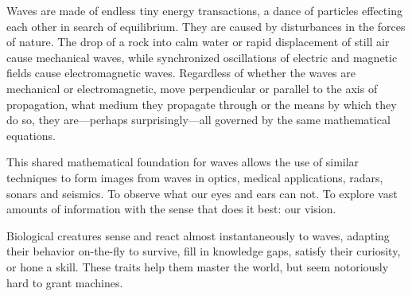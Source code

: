 %
%

Waves are made of endless tiny energy transactions, a dance of particles effecting each other in search of equilibrium. They are caused by disturbances in the forces of nature. The drop of a rock into calm water or rapid displacement of still air cause mechanical waves, while synchronized oscillations of electric and magnetic fields cause electromagnetic waves. Regardless of whether the waves are mechanical or electromagnetic, move perpendicular or parallel to the axis of propagation, what medium they propagate through or the means by which they do so, they are---perhaps surprisingly---all governed by the same mathematical equations.

This shared mathematical foundation for waves allows the use of similar techniques to form images from waves in optics, medical applications, radars, sonars and seismics. To observe what our eyes and ears can not. To explore vast amounts of information with the sense that does it best: our vision.

Biological creatures sense and react almost instantaneously to waves, adapting their behavior on-the-fly to survive, fill in knowledge gaps, satisfy their curiosity, or hone a skill. These traits help them master the world, but seem notoriously hard to grant machines.


%          



